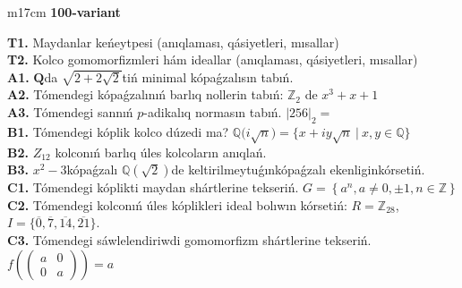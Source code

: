 \documentclass{article}
\begin{document}
\begin{tabular}{m{17cm}}
\textbf{100-variant}
\newline

\textbf{T1.} Maydanlar keńeytpesi (anıqlaması, qásiyetleri, mısallar) \\
\textbf{T2.} Kolco gomomorfizmleri hám ideallar (anıqlaması, qásiyetleri, mısallar) \\
\textbf{A1.} \(\mathbf{Q}\)da \(\sqrt{2 + 2\sqrt{2}}\)tiń minimal kópaǵzalısın tabıń. \\
\textbf{A2.} Tómendegi kópaǵzalınıń barlıq nollerin tabıń: \(\mathbb{Z}_{2}\) de \(x^{3} + x + 1\) \\
\textbf{A3.} Tómendegi sannıń \(p\)-adikalıq normasın tabıń. \(|256|_{2} =\) \\
\textbf{B1.} Tómendegi kóplik kolco dúzedi ma? \(\mathbb{Q(}i\sqrt{n}) = \{ x + iy\sqrt{n}\ |\ x,y \in \mathbb{Q}\}\) \\
\textbf{B2.} \(Z_{12}\) kolconıń barlıq úles kolcoların anıqlań. \\
\textbf{B3.} \(x^{2} - 3\)kópaǵzalı \(\mathbb{Q}(\sqrt{2})\)de keltirilmeytuǵınkópaǵzalı ekenliginkórsetiń. \\
\textbf{C1.} Tómendegi kóplikti maydan shártlerine tekseriń. \(G = \left\{ a^{n},a \neq 0, \pm 1,n \in \mathbb{Z} \right\}\) \\
\textbf{C2.} Tómendegi kolconıń úles kóplikleri ideal bolıwın kórsetiń:
\(R = \mathbb{Z}_{28}\), \(I = \{\overline{0},\overline{7},\overline{14},\overline{21}\}\). \\
\textbf{C3.} Tómendegi sáwlelendiriwdi gomomorfizm shártlerine tekseriń. \(f\left( \begin{pmatrix}
a & 0 \\
0 & a
\end{pmatrix} \right) = a\) \\

\end{tabular}
\vspace{1cm}
\end{document}
